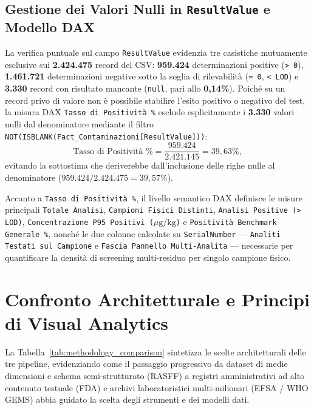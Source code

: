 \subsection{Gestione dei Valori Nulli in \texttt{ResultValue} e Modello DAX}
La verifica puntuale sul campo \texttt{ResultValue} evidenzia tre casistiche mutuamente esclusive sui \textbf{2.424.475} record del CSV: \textbf{959.424} determinazioni positive (\texttt{\textgreater{} 0}), \textbf{1.461.721} determinazioni negative sotto la soglia di rilevabilità (\texttt{= 0}, \texttt{\textless{} LOD}) e \textbf{3.330} record con risultato mancante (\texttt{null}, pari allo \textbf{0,14\%}). Poiché su un record privo di valore non è possibile stabilire l'esito positivo o negativo del test, la misura DAX \texttt{Tasso di Positività \%} esclude esplicitamente i \textbf{3.330} valori nulli dal denominatore mediante il filtro \texttt{NOT(ISBLANK(Fact\_Contaminazioni[ResultValue]))}:
\begin{equation}
\text{Tasso di Positività \%} = \frac{959.424}{2.421.145} = 39,63\%,
\end{equation}
evitando la sottostima che deriverebbe dall'inclusione delle righe nulle al denominatore ($959.424 / 2.424.475 = 39,57\%$).

Accanto a \texttt{Tasso di Positività \%}, il livello semantico DAX definisce le misure principali \texttt{Totale Analisi}, \texttt{Campioni Fisici Distinti}, \texttt{Analisi Positive (\textgreater{} LOD)}, \texttt{Concentrazione P95 Positivi ($\mu\text{g/kg}$)} e \texttt{Positività Benchmark Generale \%}, nonché le due colonne calcolate su \texttt{SerialNumber} --- \texttt{Analiti Testati sul Campione} e \texttt{Fascia Pannello Multi-Analita} --- necessarie per quantificare la densità di screening multi-residuo per singolo campione fisico.

\section{Confronto Architetturale e Principi di Visual Analytics}
\label{sec:method_comparison}

La Tabella~\ref{tab:methodology_comparison} sintetizza le scelte architetturali delle tre pipeline, evidenziando come il passaggio progressivo da dataset di medie dimensioni e schema semi-strutturato (RASFF) a registri amministrativi ad alto contenuto testuale (FDA) e archivi laboratoristici multi-milionari (EFSA / WHO GEMS) abbia guidato la scelta degli strumenti e dei modelli dati.

